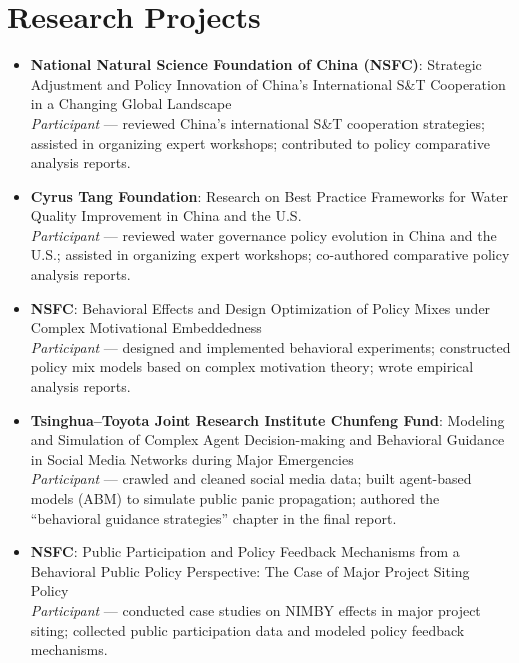 \documentclass[11pt, a4paper]{article}
\begin{document}
\section{Research Projects}

\begin{itemize}[itemsep=6pt]
    \item \textbf{National Natural Science Foundation of China (NSFC)}:
    Strategic Adjustment and Policy Innovation of China's International
    S\&T Cooperation in a Changing Global Landscape \\
    \textit{Participant} --- reviewed China's international S\&T cooperation
    strategies; assisted in organizing expert workshops; contributed to policy
    comparative analysis reports.

    \item \textbf{Cyrus Tang Foundation}:
    Research on Best Practice Frameworks for Water Quality Improvement in
    China and the U.S. \\
    \textit{Participant} --- reviewed water governance policy evolution in
    China and the U.S.; assisted in organizing expert workshops; co-authored
    comparative policy analysis reports.

    \item \textbf{NSFC}:
    Behavioral Effects and Design Optimization of Policy Mixes under Complex
    Motivational Embeddedness \\
    \textit{Participant} --- designed and implemented behavioral experiments;
    constructed policy mix models based on complex motivation theory; wrote
    empirical analysis reports.

    \item \textbf{Tsinghua--Toyota Joint Research Institute Chunfeng Fund}:
    Modeling and Simulation of Complex Agent Decision-making and Behavioral
    Guidance in Social Media Networks during Major Emergencies \\
    \textit{Participant} --- crawled and cleaned social media data; built
    agent-based models (ABM) to simulate public panic propagation; authored the
    ``behavioral guidance strategies'' chapter in the final report.

    \item \textbf{NSFC}:
    Public Participation and Policy Feedback Mechanisms from a Behavioral
    Public Policy Perspective: The Case of Major Project Siting Policy \\
    \textit{Participant} --- conducted case studies on NIMBY effects in major
    project siting; collected public participation data and modeled policy
    feedback mechanisms.
\end{itemize}
\end{document}
